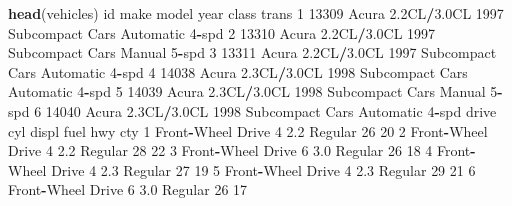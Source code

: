 \documentclass[
]{book}
\newenvironment{Shaded}{\begin{snugshade}}{\end{snugshade}}
\newcommand{\DecValTok}[1]{\textcolor[rgb]{0.00,0.00,0.81}{#1}}
\newcommand{\FloatTok}[1]{\textcolor[rgb]{0.00,0.00,0.81}{#1}}
\newcommand{\KeywordTok}[1]{\textcolor[rgb]{0.13,0.29,0.53}{\textbf{#1}}}
\newcommand{\NormalTok}[1]{#1}
\newcommand{\OperatorTok}[1]{\textcolor[rgb]{0.81,0.36,0.00}{\textbf{#1}}}
\begin{document}
\begin{Shaded}
\begin{Highlighting}[]
\KeywordTok{head}\NormalTok{(vehicles) }
\NormalTok{     id  make       model year           class           trans}
\DecValTok{1} \DecValTok{13309}\NormalTok{ Acura }\FloatTok{2.2}\NormalTok{CL}\OperatorTok{/}\FloatTok{3.0}\NormalTok{CL }\DecValTok{1997}\NormalTok{ Subcompact Cars Automatic }\DecValTok{4}\OperatorTok{-}\NormalTok{spd}
\DecValTok{2} \DecValTok{13310}\NormalTok{ Acura }\FloatTok{2.2}\NormalTok{CL}\OperatorTok{/}\FloatTok{3.0}\NormalTok{CL }\DecValTok{1997}\NormalTok{ Subcompact Cars    Manual }\DecValTok{5}\OperatorTok{-}\NormalTok{spd}
\DecValTok{3} \DecValTok{13311}\NormalTok{ Acura }\FloatTok{2.2}\NormalTok{CL}\OperatorTok{/}\FloatTok{3.0}\NormalTok{CL }\DecValTok{1997}\NormalTok{ Subcompact Cars Automatic }\DecValTok{4}\OperatorTok{-}\NormalTok{spd}
\DecValTok{4} \DecValTok{14038}\NormalTok{ Acura }\FloatTok{2.3}\NormalTok{CL}\OperatorTok{/}\FloatTok{3.0}\NormalTok{CL }\DecValTok{1998}\NormalTok{ Subcompact Cars Automatic }\DecValTok{4}\OperatorTok{-}\NormalTok{spd}
\DecValTok{5} \DecValTok{14039}\NormalTok{ Acura }\FloatTok{2.3}\NormalTok{CL}\OperatorTok{/}\FloatTok{3.0}\NormalTok{CL }\DecValTok{1998}\NormalTok{ Subcompact Cars    Manual }\DecValTok{5}\OperatorTok{-}\NormalTok{spd}
\DecValTok{6} \DecValTok{14040}\NormalTok{ Acura }\FloatTok{2.3}\NormalTok{CL}\OperatorTok{/}\FloatTok{3.0}\NormalTok{CL }\DecValTok{1998}\NormalTok{ Subcompact Cars Automatic }\DecValTok{4}\OperatorTok{-}\NormalTok{spd}
\NormalTok{              drive cyl displ    fuel hwy cty}
\DecValTok{1}\NormalTok{ Front}\OperatorTok{-}\NormalTok{Wheel Drive   }\DecValTok{4}   \FloatTok{2.2}\NormalTok{ Regular  }\DecValTok{26}  \DecValTok{20}
\DecValTok{2}\NormalTok{ Front}\OperatorTok{-}\NormalTok{Wheel Drive   }\DecValTok{4}   \FloatTok{2.2}\NormalTok{ Regular  }\DecValTok{28}  \DecValTok{22}
\DecValTok{3}\NormalTok{ Front}\OperatorTok{-}\NormalTok{Wheel Drive   }\DecValTok{6}   \FloatTok{3.0}\NormalTok{ Regular  }\DecValTok{26}  \DecValTok{18}
\DecValTok{4}\NormalTok{ Front}\OperatorTok{-}\NormalTok{Wheel Drive   }\DecValTok{4}   \FloatTok{2.3}\NormalTok{ Regular  }\DecValTok{27}  \DecValTok{19}
\DecValTok{5}\NormalTok{ Front}\OperatorTok{-}\NormalTok{Wheel Drive   }\DecValTok{4}   \FloatTok{2.3}\NormalTok{ Regular  }\DecValTok{29}  \DecValTok{21}
\DecValTok{6}\NormalTok{ Front}\OperatorTok{-}\NormalTok{Wheel Drive   }\DecValTok{6}   \FloatTok{3.0}\NormalTok{ Regular  }\DecValTok{26}  \DecValTok{17}


\end{Highlighting}
\end{Shaded}
\end{document}

